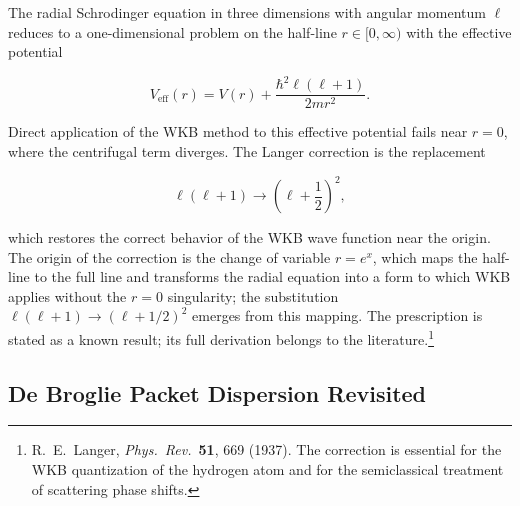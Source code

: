 The radial Schrodinger equation in three dimensions with angular momentum $\ell$ reduces to a one-dimensional problem on the half-line $r \in [0,\infty)$ with the effective potential
\begin{linenomath}
\begin{equation}
V_{\text{eff}}(r) = V(r) + \frac{\hbar^2\ell(\ell+1)}{2mr^2}.
\end{equation}
\end{linenomath}
Direct application of the WKB method to this effective potential fails near $r=0$, where the centrifugal term diverges. The Langer correction is the replacement
\begin{linenomath}
\begin{equation}
\ell(\ell+1) \to \left(\ell + \frac{1}{2}\right)^2,
\label{eq:wkb-langer}
\end{equation}
\end{linenomath}
which restores the correct behavior of the WKB wave function near the origin. The origin of the correction is the change of variable $r = e^x$, which maps the half-line to the full line and transforms the radial equation into a form to which WKB applies without the $r=0$ singularity; the substitution $\ell(\ell+1) \to (\ell+1/2)^2$ emerges from this mapping. The prescription is stated as a known result; its full derivation belongs to the literature.\footnote{R.\ E.\ Langer, \emph{Phys.\ Rev.}\ \textbf{51}, 669 (1937). The correction is essential for the WKB quantization of the hydrogen atom and for the semiclassical treatment of scattering phase shifts.}

\subsection{De Broglie Packet Dispersion Revisited}

